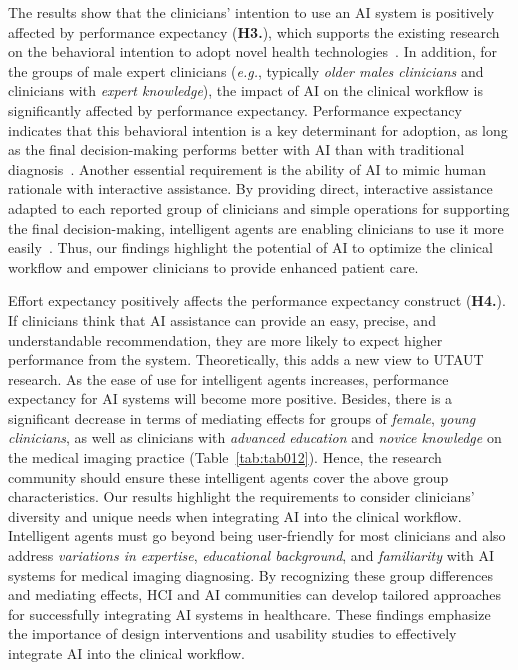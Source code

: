 The results show that the clinicians' intention to use an \ac{AI} system is positively affected by performance expectancy ({\bf H3.}), which supports the existing research on the behavioral intention to adopt novel health technologies~\cite{WU2021106840}.
In addition, for the groups of male expert clinicians ({\it e.g.}, typically {\it older males clinicians} and clinicians with {\it expert knowledge}), the impact of \ac{AI} on the clinical workflow is significantly affected by performance expectancy.
Performance expectancy indicates that this behavioral intention is a key determinant for adoption, as long as the final decision-making performs better with \ac{AI} than with traditional diagnosis~\cite{LIN2021e486}.
Another essential requirement is the ability of \ac{AI} to mimic human rationale with interactive assistance.
By providing direct, interactive assistance adapted to each reported group of clinicians and simple operations for supporting the final decision-making, intelligent agents are enabling clinicians to use it more easily~\cite{CALISTO2021102607}.
Thus, our findings highlight the potential of \ac{AI} to optimize the clinical workflow and empower clinicians to provide enhanced patient care.

Effort expectancy positively affects the performance expectancy construct ({\bf H4.}).
If clinicians think that \ac{AI} assistance can provide an easy, precise, and understandable recommendation, they are more likely to expect higher performance from the system.
Theoretically, this adds a new view to \ac{UTAUT} research.
As the ease of use for intelligent agents increases, performance expectancy for \ac{AI} systems will become more positive.
Besides, there is a significant decrease in terms of mediating effects for groups of {\it female}, {\it young clinicians}, as well as clinicians with {\it advanced education} and {\it novice knowledge} on the medical imaging practice (Table~\ref{tab:tab012}).
Hence, the research community should ensure these intelligent agents cover the above group characteristics.
Our results highlight the requirements to consider clinicians' diversity and unique needs when integrating \ac{AI} into the clinical workflow.
Intelligent agents must go beyond being user-friendly for most clinicians and also address {\it variations in expertise}, {\it educational background}, and {\it familiarity} with \ac{AI} systems for medical imaging diagnosing.
By recognizing these group differences and mediating effects, \ac{HCI} and \ac{AI} communities can develop tailored approaches for successfully integrating \ac{AI} systems in healthcare.
These findings emphasize the importance of design interventions and usability studies to effectively integrate \ac{AI} into the clinical workflow.

